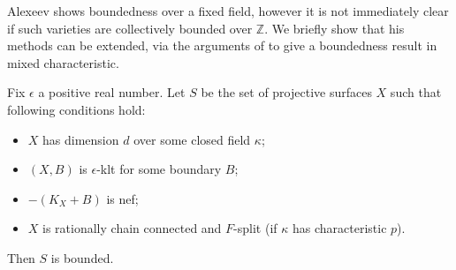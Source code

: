 	Alexeev shows boundedness over a fixed field, however it is not immediately clear if such varieties are collectively bounded over $\mathbb{Z}$. We briefly show that his methods can be extended, via the arguments of \cite{witaszek2015effective} to give a boundedness result in mixed characteristic.
	
	\begin{theorem}\label{SBAB}
			Fix $\epsilon$ a positive real number. Let $S$ be the set of projective surfaces $X$ such that following conditions hold:
		\begin{itemize}
			\item $X$ has dimension $d$ over some closed field $\kappa$;
			\item $(X,B)$ is $\epsilon$-klt for some boundary $B$;
			\item $-(K_{X}+B)$ is nef;
			\item $X$ is rationally chain connected and $F$-split (if $\kappa$ has characteristic $p$).
		\end{itemize}
		Then $S$ is bounded.
	\end{theorem}
